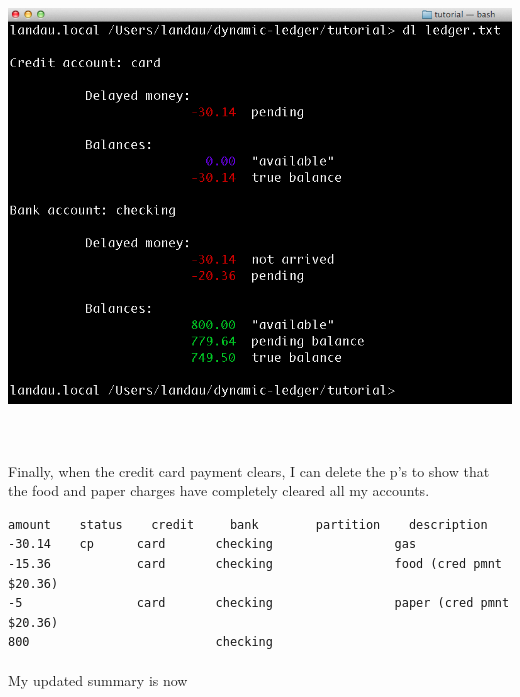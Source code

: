 \documentclass{article}
\providecommand{\q}{$\quad$ \newline}
\begin{document}
\begin{flushleft}
\begin{center}
\includegraphics[scale=.45]{fig/sum6.png}
\end{center} \q

\paragraph{} Finally, when the credit card payment clears, I can delete the p's to show that the food and paper charges have completely cleared all my accounts.

\begin{lstlisting}[title=ledger.txt]
amount    status	credit     bank        partition    description
-30.14    cp      card       checking                 gas
-15.36            card       checking                 food (cred pmnt $20.36)
-5                card       checking                 paper (cred pmnt $20.36)
800                          checking
\end{lstlisting}

\paragraph{} My updated summary is now


\end{flushleft}
\end{document}
